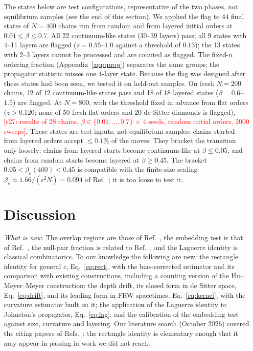 \documentclass[prd,twocolumn,superscriptaddress,nofootinbib,amsmath,amssymb,floatfix]{revtex4-2}
\newcommand{\pending}[1]{\textcolor{red}{[#1]}}
\begin{document}
The states below are test configurations, representative of the two phases, not equilibrium samples (see the end of this section). We applied the flag to 44 final states of $N=400$ chains run from random and from layered initial orders at $0.01\leq\beta\leq0.7$. All 22 continuum-like states (30--39 layers) pass; all 9 states with 4--11 layers are flagged ($z=0.55$--$1.0$ against a threshold of $0.13$); the 13 states with 2--3 layers cannot be processed and are counted as flagged. The fixed-$n$ ordering fraction (Appendix~\ref{app:prop}) separates the same groups; the propagator statistic misses one 4-layer state. Because the flag was designed after these states had been seen, we tested it on held-out samples. On fresh $N=200$ chains, 12 of 12 continuum-like states pass and 18 of 18 layered states ($\beta=0.6$--$1.5$) are flagged. At $N=800$, with the threshold fixed in advance from flat orders ($z>0.120$; none of 50 fresh flat orders and 20 de Sitter diamonds is flagged), \pending{r27: results of 28 chains, $\beta\in\{0.01,\dots,0.7\}$ $\times$ 4 seeds, random initial orders, 2000 sweeps}. These states are test inputs, not equilibrium samples: chains started from layered orders accept $\leq0.1\%$ of the moves. They bracket the transition only loosely: chains from layered starts become continuum-like at $\beta\leq0.05$, and chains from random starts become layered at $\beta\geq0.45$. The bracket $0.05<\beta_c(400)<0.45$ is compatible with the finite-size scaling $\beta_c\approx1.66/(\epsilon^2N)=0.094$ of Ref.~\cite{GOS18}; it is too loose to test it.

\section{Discussion}\label{sec:disc}
\emph{What is new.} The overlap regions are those of Ref.~\cite{BK24}, the embedding test is that of Ref.~\cite{CloughEvans16}, the null-pair fraction is related to Ref.~\cite{GlaserSurya13}, and the Laguerre identity is classical combinatorics. To our knowledge the following are new: the rectangle identity for general $c$, Eq.~\eqref{eq:rect}, with the bias-corrected estimator and its comparison with existing constructions, including a counting version of the Hu--Meyer--Meyer construction; the depth drift, its closed form in de Sitter space, Eq.~\eqref{eq:drift}, and its leading form in FRW spacetimes, Eq.~\eqref{eq:kernel}, with the curvature estimator built on it; the application of the Laguerre identity to Johnston's propagator, Eq.~\eqref{eq:lag}; and the calibration of the embedding test against size, curvature and layering. Our literature search (October 2026) covered the citing papers of Refs.~\cite{BK24,CloughEvans16,Johnston08,Johnston09}; the rectangle identity is elementary enough that it may appear in passing in work we did not reach.
\end{document}
